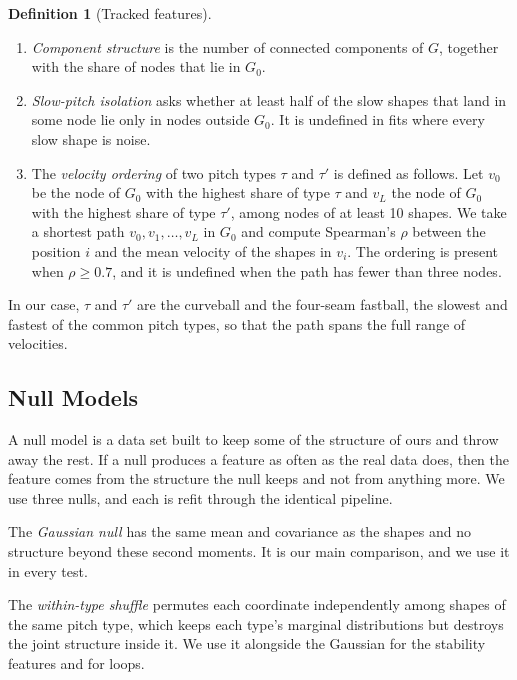 \documentclass[11pt]{article}
\theoremstyle{definition}
\newtheorem{definition}[theorem]{Definition}
\theoremstyle{remark}
\begin{document}
\begin{definition}[Tracked features]\label{def:features}
\leavevmode
\begin{enumerate}[label=(\roman*), leftmargin=*]
  \item \emph{Component structure} is the number of connected components of $G$, together with the share of nodes that lie in $G_0$.
  \item \emph{Slow-pitch isolation} asks whether at least half of the slow shapes that land in some node lie only in nodes outside $G_0$. It is undefined in fits where every slow shape is noise.
  \item The \emph{velocity ordering} of two pitch types $\tau$ and $\tau'$ is defined as follows. Let $v_0$ be the node of $G_0$ with the highest share of type $\tau$ and $v_L$ the node of $G_0$ with the highest share of type $\tau'$, among nodes of at least 10 shapes. We take a shortest path $v_0, v_1, \dots, v_L$ in $G_0$ and compute Spearman's $\rho$ between the position $i$ and the mean velocity of the shapes in $v_i$. The ordering is present when $\rho \ge 0.7$, and it is undefined when the path has fewer than three nodes.
\end{enumerate}
\end{definition}
In our case, $\tau$ and $\tau'$ are the curveball and the four-seam fastball, the slowest and fastest of the common pitch types, so that the path spans the full range of velocities.

\subsection{Null Models}\label{sec:nulls}
A null model is a data set built to keep some of the structure of ours and throw away the rest.
If a null produces a feature as often as the real data does, then the feature comes from the structure the null keeps and not from anything more.
We use three nulls, and each is refit through the identical pipeline.

The \emph{Gaussian null} has the same mean and covariance as the shapes and no structure beyond these second moments. It is our main comparison, and we use it in every test.

The \emph{within-type shuffle} permutes each coordinate independently among shapes of the same pitch type, which keeps each type's marginal distributions but destroys the joint structure inside it. We use it alongside the Gaussian for the stability features and for loops.
\end{document}
